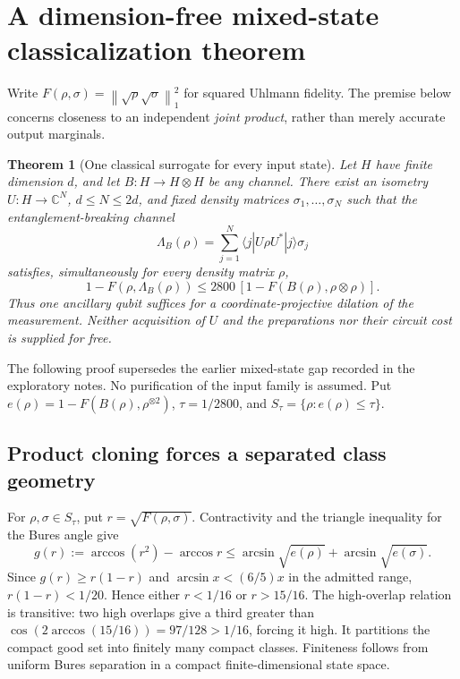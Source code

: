 \documentclass[11pt]{article}
\newtheorem{theorem}{Theorem}
\newcommand{\norm}[1]{\left\lVert#1\right\rVert}
\begin{document}
\section{A dimension-free mixed-state classicalization theorem}\label{sec:mixed}

Write $F(\rho,\sigma)=\norm{\sqrt\rho\sqrt\sigma}_1^2$ for squared Uhlmann fidelity. The premise below concerns closeness to an independent \emph{joint product}, rather than merely accurate output marginals.

\begin{theorem}[One classical surrogate for every input state]\label{thm:mixed}
Let $H$ have finite dimension $d$, and let $B:H\to H\otimes H$ be any channel. There exist an isometry $U:H\to\mathbb C^N$, $d\le N\le2d$, and fixed density matrices $\sigma_1,\ldots,\sigma_N$ such that the entanglement-breaking channel
\[
\Lambda_B(\rho)=\sum_{j=1}^N\langle j|U\rho U^*|j\rangle\sigma_j
\]
satisfies, simultaneously for every density matrix $\rho$,
\[
1-F(\rho,\Lambda_B(\rho))\le2800\,[1-F(B(\rho),\rho\otimes\rho)].
\tag{M1}
\]
Thus one ancillary qubit suffices for a coordinate-projective dilation of the \emph{measurement}. Neither acquisition of $U$ and the preparations nor their circuit cost is supplied for free.
\end{theorem}

The following proof supersedes the earlier mixed-state gap recorded in the exploratory notes. No purification of the input family is assumed. Put $e(\rho)=1-F(B(\rho),\rho^{\otimes2})$, $\tau=1/2800$, and $S_\tau=\{\rho:e(\rho)\le\tau\}$.

\subsection{Product cloning forces a separated class geometry}

For $\rho,\sigma\in S_\tau$, put $r=\sqrt{F(\rho,\sigma)}$. Contractivity and the triangle inequality for the Bures angle give
\[
g(r):=\arccos(r^2)-\arccos r
\le\arcsin\sqrt{e(\rho)}+\arcsin\sqrt{e(\sigma)}.
\tag{M2}
\]
Since $g(r)\ge r(1-r)$ and $\arcsin x<(6/5)x$ in the admitted range, $r(1-r)<1/20$. Hence either $r<1/16$ or $r>15/16$. The high-overlap relation is transitive: two high overlaps give a third greater than $\cos(2\arccos(15/16))=97/128>1/16$, forcing it high. It partitions the compact good set into finitely many compact classes. Finiteness follows from uniform Bures separation in a compact finite-dimensional state space.
\end{document}
